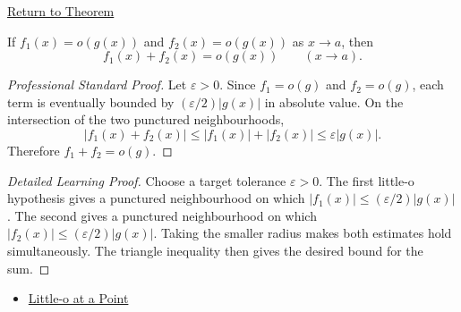 \newpage
{}
\label{prf:little-o-sum-rule}

\begin{remark*}[Return]
\hyperref[prop:little-o-sum-rule]{Return to Theorem}
\end{remark*}

\begin{proposition*}
If $f_1(x)=o(g(x))$ and $f_2(x)=o(g(x))$ as $x\to a$, then
\[
  f_1(x)+f_2(x)=o(g(x))\qquad (x\to a).
\]
\end{proposition*}

\begin{proof}[Professional Standard Proof]
\LRAProofBodyStart
Let $\varepsilon>0$. Since $f_1=o(g)$ and $f_2=o(g)$, each term is eventually
bounded by $(\varepsilon/2)|g(x)|$ in absolute value. On the intersection of
the two punctured neighbourhoods,
\[
  |f_1(x)+f_2(x)|
  \leq |f_1(x)|+|f_2(x)|
  \leq \varepsilon |g(x)|.
\]
Therefore $f_1+f_2=o(g)$.
\end{proof}

\begin{proof}[Detailed Learning Proof]
\LRAProofBodyStart
Choose a target tolerance $\varepsilon>0$. The first little-o hypothesis gives
a punctured neighbourhood on which $|f_1(x)|\leq(\varepsilon/2)|g(x)|$. The
second gives a punctured neighbourhood on which
$|f_2(x)|\leq(\varepsilon/2)|g(x)|$. Taking the smaller radius makes both
estimates hold simultaneously. The triangle inequality then gives the desired
bound for the sum.
\end{proof}

\begin{dependencies}
\begin{itemize}
  \item \hyperref[def:little-o-at-a-point]{Little-o at a Point}
\end{itemize}
\end{dependencies}

\clearpage
